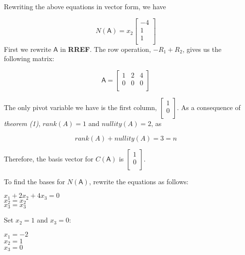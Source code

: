 \documentclass[a4paper, 11pt]{article}
\newcommand{\mat}[1]{\boldsymbol { \mathsf{#1}} }
\begin{document}
\begin{enumerate}
Rewriting the above equations in vector form, we have

\begin{equation*}
    N(\mat{A}) = x_2 
    \begin{bmatrix}
    -4 \\
    1 \\
    1 \\
    \end{bmatrix}
\end{equation*}First we rewrite $\mat{A}$ in \textbf{RREF}. The row operation, $-R_1 + R_2$, gives us the following matrix:

\begin{equation*}
    \mat{A} = 
    \begin{bmatrix}
    1 & 2 & 4 \\
    0 & 0 & 0 \\
    \end{bmatrix}
\end{equation*}

The only pivot variable we have is the first column, $\begin{bmatrix}
1 \\
0 \\
\end{bmatrix}$. As a consequence of \textit{theorem (1)}, $rank(A) = 1$ and $nullity(A) = 2$, as 

\begin{equation*}
    rank(A) + nullity(A) = 3 = n
\end{equation*}

Therefore, the basis vector for $C(\mat{A})$ is $\begin{bmatrix}
1 \\
0 \\
\end{bmatrix}$.

To find the bases for $N(\mat{A})$, rewrite the equations as follows:
\begin{center}
    $x_1 + 2x_2 + 4x_3 = 0$\\
    $x_2 = x_2$ \\
    $x_3 = x_3$ \\
\end{center}

Set $x_2 = 1$ and $x_3 = 0$:

\begin{center}
    $x_1  = -2$ \\
    $x_2 = 1$ \\
    $x_3 = 0$ \\
\end{center}


\end{enumerate}
\end{document}
